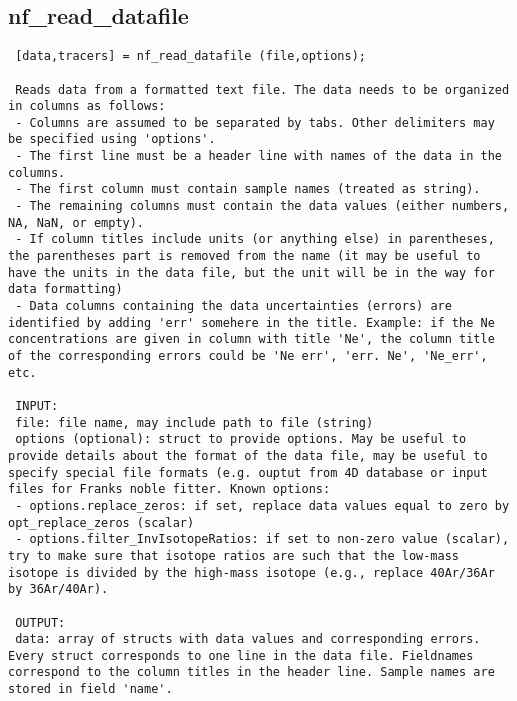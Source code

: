 \subsection{nf\_read\_datafile}\label{sec:ref-nf_read_datafile}
\begin{lstlisting}
 [data,tracers] = nf_read_datafile (file,options);

 Reads data from a formatted text file. The data needs to be organized in columns as follows:
 - Columns are assumed to be separated by tabs. Other delimiters may be specified using 'options'.
 - The first line must be a header line with names of the data in the columns.
 - The first column must contain sample names (treated as string).
 - The remaining columns must contain the data values (either numbers, NA, NaN, or empty).
 - If column titles include units (or anything else) in parentheses, the parentheses part is removed from the name (it may be useful to have the units in the data file, but the unit will be in the way for data formatting)
 - Data columns containing the data uncertainties (errors) are identified by adding 'err' somehere in the title. Example: if the Ne concentrations are given in column with title 'Ne', the column title of the corresponding errors could be 'Ne err', 'err. Ne', 'Ne_err', etc.

 INPUT:
 file: file name, may include path to file (string)
 options (optional): struct to provide options. May be useful to provide details about the format of the data file, may be useful to specify special file formats (e.g. ouptut from 4D database or input files for Franks noble fitter. Known options:
 - options.replace_zeros: if set, replace data values equal to zero by opt_replace_zeros (scalar)
 - options.filter_InvIsotopeRatios: if set to non-zero value (scalar), try to make sure that isotope ratios are such that the low-mass isotope is divided by the high-mass isotope (e.g., replace 40Ar/36Ar by 36Ar/40Ar).

 OUTPUT:
 data: array of structs with data values and corresponding errors. Every struct corresponds to one line in the data file. Fieldnames correspond to the column titles in the header line. Sample names are stored in field 'name'.

 
\end{lstlisting}

